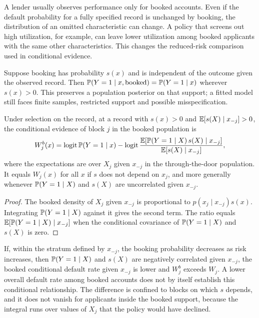 A lender usually observes performance only for booked accounts. Even if the default probability for a fully specified record is unchanged by booking, the distribution of an omitted characteristic can change. A policy that screens out high utilization, for example, can leave lower utilization among booked applicants with the same other characteristics. This changes the reduced-risk comparison used in conditional evidence.

Suppose booking has probability $s(x)$ and is independent of the outcome given the observed record. Then $\mathbb P(Y=1\mid x,\text{booked})=\mathbb P(Y=1\mid x)$ wherever $s(x)>0$. This preserves a population posterior on that support; a fitted model still faces finite samples, restricted support and possible misspecification.

\begin{proposition}\label{prop:selection}
Under selection on the record, at a record with $s(x)>0$ and $\mathbb E[s(X)\mid x_{-j}]>0$, the conditional evidence of block $j$ in the booked population is
\begin{equation}\label{eq:booked}
W^{b}_j(x)=\operatorname{logit}\mathbb P(Y=1\mid x)-\operatorname{logit}\frac{\mathbb E[\mathbb P(Y=1\mid X)\,s(X)\mid x_{-j}]}{\mathbb E[s(X)\mid x_{-j}]},
\end{equation}
where the expectations are over $X_j$ given $x_{-j}$ in the through-the-door population. It equals $W_j(x)$ for all $x$ if $s$ does not depend on $x_j$, and more generally whenever $\mathbb P(Y=1\mid X)$ and $s(X)$ are uncorrelated given $x_{-j}$.
\end{proposition}
\begin{proof}
The booked density of $X_j$ given $x_{-j}$ is proportional to $p(x_j\mid x_{-j})s(x)$. Integrating $\mathbb P(Y=1\mid X)$ against it gives the second term. The ratio equals $\mathbb E[\mathbb P(Y=1\mid X)\mid x_{-j}]$ when the conditional covariance of $\mathbb P(Y=1\mid X)$ and $s(X)$ is zero.
\end{proof}

If, within the stratum defined by $x_{-j}$, the booking probability decreases as risk increases, then $\mathbb P(Y=1\mid X)$ and $s(X)$ are negatively correlated given $x_{-j}$, the booked conditional default rate given $x_{-j}$ is lower and $W^b_j$ exceeds $W_j$. A lower overall default rate among booked accounts does not by itself establish this conditional relationship. The difference is confined to blocks on which $s$ depends, and it does not vanish for applicants inside the booked support, because the integral runs over values of $X_j$ that the policy would have declined.

